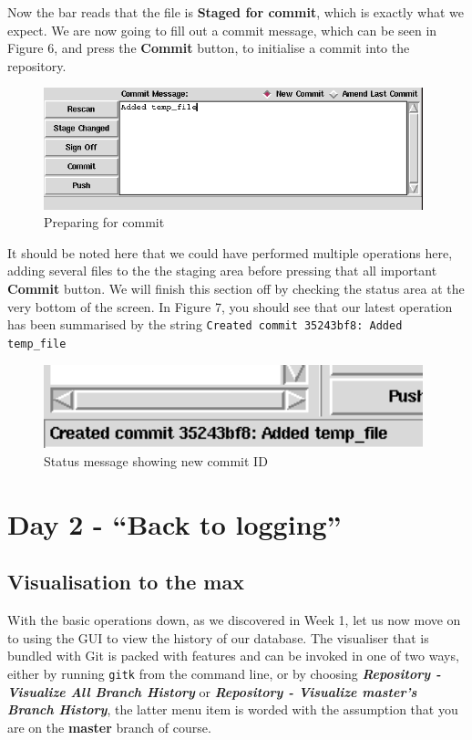 Now the bar reads that the file is \textbf{Staged for commit}, which is exactly what we expect.
We are now going to fill out a commit message, which can be seen in Figure 6, and press the \textbf{Commit} button, to initialise a commit into the repository.

\begin{figure}[hbt]
\centering
\includegraphics[width=11cm]{images/f-w5-d6.png}
\caption{Preparing for commit}
\end{figure}

It should be noted here that we could have performed multiple operations here, adding several files to the the staging area before pressing that all important \textbf{Commit} button.
We will finish this section off by checking the status area at the very bottom of the screen.
In Figure 7, you should see that our latest operation has been summarised by the string \texttt{Created commit 35243bf8: Added temp\_file}

\begin{figure}[hbt]
\centering
\includegraphics[width=11cm]{images/f-w5-d7.png}
\caption{Status message showing new commit ID}
\end{figure}

\section{Day 2 - ``Back to logging''}
\subsection{Visualisation to the max}

With the basic operations down, as we discovered in Week 1, let us now move on to using the GUI to view the history of our database.
The visualiser that is bundled with Git is packed with features and can be invoked in one of two ways, either by running \texttt{gitk} from the command line, or by choosing \textbf{\emph{Repository - Visualize All Branch History}} or \textbf{\emph{Repository - Visualize master's Branch History}}, the latter menu item is worded with the assumption that you are on the \textbf{master} branch of course.

